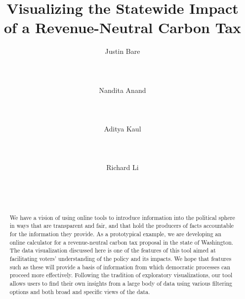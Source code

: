 \documentclass{sigchi}
\begin{document}
\title{Visualizing the Statewide Impact of a Revenue-Neutral Carbon Tax}

\author{
  \alignauthor Justin Bare\\
    \\
    \\
    \\
    \affaddr{}
  \alignauthor Nandita Anand\\
      \\
      \\
      \\
      \affaddr{}
  \alignauthor Aditya Kaul\\
      \\
      \\
      \\
      \affaddr{}
  \alignauthor Richard Li\\
      \\
      \\
      \\
      \affaddr{}
}

\maketitle

\begin{abstract}
We have a vision of using online tools to introduce information into the political sphere in ways that are transparent and fair, and that hold the producers of facts accountable for the information they provide. As a prototypical example, we are developing an online calculator for a revenue-neutral carbon tax proposal in the state of Washington. The data visualization discussed here is one of the features of this tool aimed at facilitating voters' understanding of the policy and its impacts. We hope that features such as these will provide a basis of information from which democratic processes can proceed more effectively. Following the tradition of exploratory visualizations, our tool allows users to find their own insights from a large body of data using various filtering options and both broad and specific views of the data. 



\end{abstract}
\end{document}
